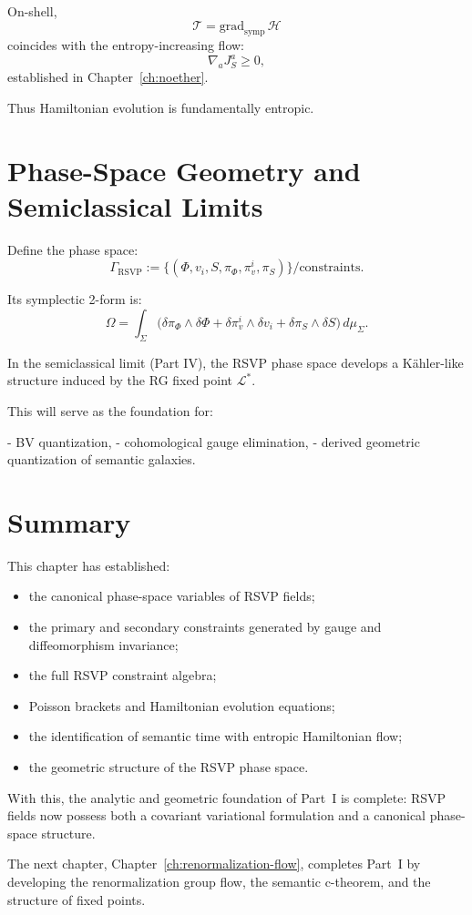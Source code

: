 \begin{proposition}
On-shell,
\[
\mathcal{T} = \mathrm{grad}_{\mathrm{symp}}\,\mathcal{H}
\]
coincides with the entropy-increasing flow:
\[
\nabla_a J^a_S \ge 0,
\]
established in Chapter~\ref{ch:noether}.
\end{proposition}

Thus Hamiltonian evolution is fundamentally entropic.

\section{Phase-Space Geometry and Semiclassical Limits}

Define the phase space:
\[
\Gamma_\mathrm{RSVP}
 := \{(\Phi,v_i,S,\pi_\Phi,\pi^i_v,\pi_S)\}/\text{constraints}.
\]

Its symplectic 2-form is:
\[
\Omega
 = \int_\Sigma
   \big(
     \delta \pi_\Phi \wedge \delta \Phi
    +\delta \pi^i_v \wedge \delta v_i
    +\delta \pi_S \wedge \delta S
   \big)\, d\mu_\Sigma.
\]

In the semiclassical limit (Part IV), the RSVP phase space develops
a Kähler-like structure induced by the RG fixed point $\mathcal{L}^*$.

This will serve as the foundation for:

- BV quantization,  
- cohomological gauge elimination,  
- derived geometric quantization of semantic galaxies.

\section{Summary}

This chapter has established:

\begin{itemize}
\item the canonical phase-space variables of RSVP fields;
\item the primary and secondary constraints generated by gauge and diffeomorphism invariance;
\item the full RSVP constraint algebra;
\item Poisson brackets and Hamiltonian evolution equations;
\item the identification of semantic time with entropic Hamiltonian flow;
\item the geometric structure of the RSVP phase space.
\end{itemize}

With this, the analytic and geometric foundation of Part~I is complete:
RSVP fields now possess both a covariant variational formulation and a
canonical phase-space structure.

The next chapter, Chapter~\ref{ch:renormalization-flow}, completes Part~I by
developing the renormalization group flow, the semantic c-theorem, and the
structure of fixed points.

